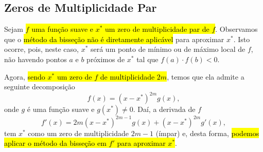 \subsection{Zeros de Multiplicidade Par}

Sejam \hl{$f$ uma função suave e $x^*$ um zero de multiplicidade par de $f$}. Observamos que o \hl{método da bisseção não é diretamente aplicável} para aproximar $x^*$. Isto ocorre, pois, neste caso, $x^*$ será um ponto de mínimo ou de máximo local de $f$, não havendo pontos $a$ e $b$ próximos de $x^*$ tal que $f(a)\cdot f(b) < 0$.

Agora, \hl{sendo $x^*$ um zero de $f$ de multiplicidade $2m$}, temos que ela admite a seguinte decomposição
\begin{equation}
  f(x) = (x-x^*)^{2m}g(x),
\end{equation}
onde $g$ é uma função suave e $g(x^*)\neq 0$. Daí, a derivada de $f$
\begin{equation}
  f'(x) = 2m(x-x^*)^{2m-1}g(x) + (x-x^*)^{2m}g'(x),
\end{equation}
tem $x^*$ como um zero de multiplicidade $2m-1$ (ímpar) e, desta forma, \hl{podemos aplicar o método da bisseção em $f'$ para aproximar $x^*$}.

